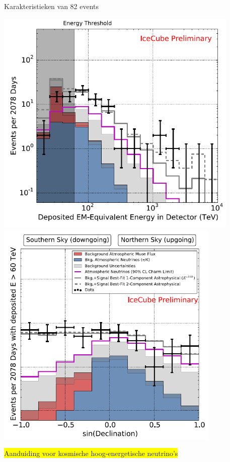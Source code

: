 \Tr
\onecolumn
\begin{center}
{\blue Karakteristieken van 82 events}
\end{center}
\includegraphics[keepaspectratio,height=11cm]{hese-e-6yr}
\includegraphics[keepaspectratio,height=11cm]{hese-decl-6yr}
\begin{center}
\colorbox{yellow}{Aanduiding voor kosmische hoog-energetische neutrino's}
\end{center}


